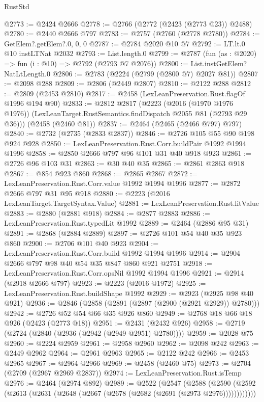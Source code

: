 \begin{lexlean}{RustStd}
\begin{coremodule}
@2773 := @2424 @2666
@2778 := @2766 (@2772 (@2423 (@2773 @23)) @2488)
@2780 := @2440 @2666 @797
@2783 := @2757 (@2760 (@2778 @2780))
@2784 := GetElem?.getElem?.{0, 0, 0}
@2787 := @2784 @2020 @10 @7
@2792 := LT.lt.{0} @10 instLTNat @2032
@2793 := List.length.{0}
@2799 := @2787 (fun (as : @2020) => fun (i : @10) => @2792 (@2793 @7 @2076))
@2800 := List.instGetElem?NatLtLength.{0}
@2806 := @2783 (@2224 (@2799 (@2800 @7) @2027 @81))
@2807 := @2098 @288
@2809 := @2806 (@2449 @2807)
@2810 := @2122 @288
@2812 := @2809 (@2453 @2810)
@2817 := @2458 (LexLeanPreservation.Rust.flagOf @1996 @194 @90)
@2833 := @2812
    @2817
    (@2223
      (@2016 (@1970 @1976 @1976))
      (LexLeanTarget.RustSemantics.findDispatch @2055 @81 (@2793 @29 @36)))
    (@2458 (@2460 @81))
@2837 := @2464 (@2465 (@2466 @797) @797)
@2840 := @2732 (@2735 (@2833 @2837))
@2846 := @2726 @105 @55 @90 @198 @924 @928
@2850 := LexLeanPreservation.Rust.Corr.buildPair @1992 @1994 @1996
@2858 := @2850 @2666 @797 @96 @101 @31 @40 @918 @923
@2861 := @2726 @96 @103 @31
@2863 := @30 @40 @35
@2865 := @2861 @2863 @918
@2867 := @854 @923 @860
@2868 := @2865 @2867
@2872 := LexLeanPreservation.Rust.Corr.value @1992 @1994 @1996
@2877 := @2872 @2666 @797 @31 @95 @918
@2880 := @2223 (@2016 LexLeanTarget.TargetSyntax.Value)
@2881 := LexLeanPreservation.Rust.litValue
@2883 := @2880 (@2881 @918)
@2884 := @2877 @2883
@2886 := LexLeanPreservation.Rust.typedLit @1992
@2889 := @2464 (@2886 @95 @31)
@2891 := @2868 (@2884 @2889)
@2897 := @2726 @101 @54 @40 @35 @923 @860
@2900 := @2706 @101 @40 @923
@2904 := LexLeanPreservation.Rust.Corr.build @1992 @1994 @1996
@2914 := @2904 @2666 @797 @98 @40 @54 @35 @847 @860 @921 @2751
@2918 := LexLeanPreservation.Rust.Corr.opsNil @1992 @1994 @1996
@2921 := @2914 (@2918 @2666 @797)
@2923 := @2223 (@2016 @1972)
@2925 := LexLeanPreservation.Rust.buildShape @1992
@2929 := @2923 (@2925 @98 @40 @921)
@2936 := @2846 (@2858 (@2891 (@2897 (@2900 (@2921 @2929)) @2780)))
@2942 := @2726 @52 @54 @66 @35 @926 @860
@2949 := @2768 @18 @66 @18 @926 (@2423 (@2773 @18))
@2951 := @2431 (@2432 @926)
@2958 := @2719 (@2724 (@2840 (@2936 (@2942 (@2949 @2951) @2780))))
@2959 := @2028 @75
@2960 := @2224 @2959
@2961 := @2958 @2960
@2962 := @2098 @242
@2963 := @2449 @2962
@2964 := @2961 @2963
@2965 := @2122 @242
@2966 := @2453 @2965
@2967 := @2964 @2966
@2969 := @2458 (@2460 @75)
@2973 := @2704 (@2709 (@2967 @2969 @2837))
@2974 := LexLeanPreservation.Rust.isTemp
@2976 := @2464 (@2974 @892)
@2989 := @2522
    (@2547
      (@2588 (@2590 (@2592 (@2613 (@2631 (@2648 (@2667 (@2678 (@2682 (@2691 (@2973 @2976))))))))))))

\end{coremodule}
\end{lexlean}
